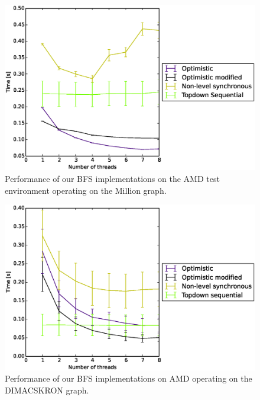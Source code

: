 \documentclass[letterpaper]{article}
\begin{document}
		\begin{figure}\centering
	  		\includegraphics[scale=0.33]{amd_biggraph.eps}
	  		\caption{Performance of our BFS implementations on the AMD test environment operating on the Million graph.\label{fig:amdbig}}
		\end{figure}
		\begin{figure}\centering
	  		\includegraphics[scale=0.33]{amd_dimacskron.eps}
	  		\caption{Performance of our BFS implementations on AMD operating on the DIMACSKRON graph.\label{fig:amdkron}}
		\end{figure}
\end{document}
